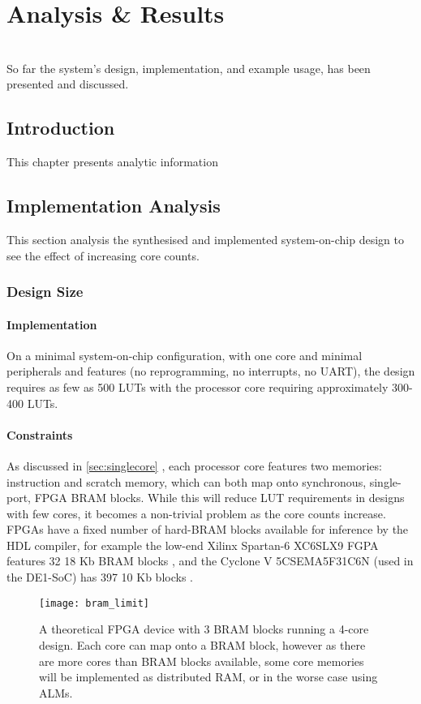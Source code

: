 \chapter{Analysis \& Results}
\startcontents[chapters]
\noindent\\
So far the system's design, implementation, and example usage, has been presented and discussed.

\section{Introduction}
This chapter presents analytic information

\section{Implementation Analysis}
This section analysis the synthesised and implemented system-on-chip design to see the effect of increasing core counts.

\subsection{Design Size}
\subsubsection{Implementation}
On a minimal system-on-chip configuration, with one core and minimal peripherals and features (no reprogramming, no interrupts, no UART), the design requires as few as 500 LUTs with the processor core requiring approximately 300-400 LUTs.

\subsubsection{Constraints}
As discussed in \cref{sec:singlecore} , each processor core features two memories: instruction and scratch memory, which can both map onto synchronous, single-port, FPGA BRAM blocks. While this will reduce LUT requirements in designs with few cores, it becomes a non-trivial problem as the core counts increase. FPGAs have a fixed number of hard-BRAM blocks available for inference by the HDL compiler, for example the low-end Xilinx Spartan-6 XC6SLX9 FGPA features 32 18 Kb BRAM blocks \cite[p.~2]{s6fam}, and the Cyclone V 5CSEMA5F31C6N (used in the DE1-SoC) has 397 10 Kb blocks \cite[p.~22]{cvfam}.

\begin{figure}[h]
\centering
\texttt{[image: bram\_limit]}
\caption{A theoretical FPGA device with 3 BRAM blocks running a 4-core design. Each core can map onto a BRAM block, however as there are more cores than BRAM blocks available, some core memories will be implemented as distributed RAM, or in the worse case using ALMs.}
\label{fig:bram_limit}
\end{figure}

